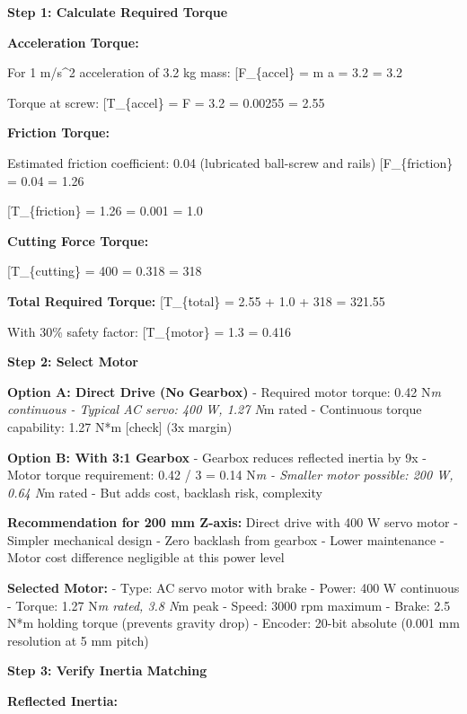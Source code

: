 \documentclass[
]{article}
\begin{document}
\textbf{Step 1: Calculate Required Torque}

\textbf{Acceleration Torque:}

For 1 m/s\^{}2 acceleration of 3.2 kg mass: {[}F\_\{accel\} = m a = 3.2
 = 3.2 \text{ N}{]}

Torque at screw: {[}T\_\{accel\} = F \times {} = 3.2
\times {} = 0.00255  = 2.55 \text{ mN*m}{]}

\textbf{Friction Torque:}

Estimated friction coefficient: 0.04 (lubricated ball-screw and rails)
{[}F\_\{friction\} = 0.04  = 1.26 \text{ N}{]}

{[}T\_\{friction\} = 1.26 \times {} = 0.001 
= 1.0 \text{ mN*m}{]}

\textbf{Cutting Force Torque:}

{[}T\_\{cutting\} = 400 \times {} = 0.318  =
318 \text{ mN*m}{]}

\textbf{Total Required Torque:} {[}T\_\{total\} = 2.55 + 1.0 + 318 =
321.55   \text{ N*m}{]}

With 30\% safety factor: {[}T\_\{motor\} = 1.3  = 0.416
\text{ N*m}{]}

\textbf{Step 2: Select Motor}

\textbf{Option A: Direct Drive (No Gearbox)} - Required motor torque:
0.42 N\emph{m continuous - Typical AC servo: 400 W, 1.27 N}m rated -
Continuous torque capability: 1.27 N*m {[}check{]} (3x margin)

\textbf{Option B: With 3:1 Gearbox} - Gearbox reduces reflected inertia
by 9x - Motor torque requirement: 0.42 / 3 = 0.14 N\emph{m - Smaller
motor possible: 200 W, 0.64 N}m rated - But adds cost, backlash risk,
complexity

\textbf{Recommendation for 200 mm Z-axis:} Direct drive with 400 W servo
motor - Simpler mechanical design - Zero backlash from gearbox - Lower
maintenance - Motor cost difference negligible at this power level

\textbf{Selected Motor:} - Type: AC servo motor with brake - Power: 400
W continuous - Torque: 1.27 N\emph{m rated, 3.8 N}m peak - Speed: 3000
rpm maximum - Brake: 2.5 N*m holding torque (prevents gravity drop) -
Encoder: 20-bit absolute (0.001 mm resolution at 5 mm pitch)

\textbf{Step 3: Verify Inertia Matching}

\textbf{Reflected Inertia:}
\end{document}

